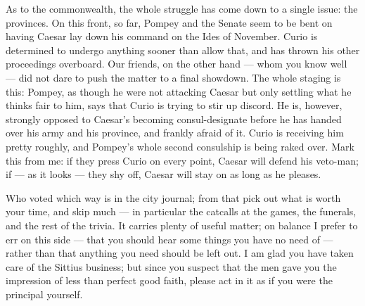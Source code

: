  As to the commonwealth, the whole struggle has come down to a single issue: the provinces. On this front, so far, Pompey and the Senate seem to be bent on having Caesar lay down his command on the Ides of November. Curio is determined to undergo anything sooner than allow that, and has thrown his other proceedings overboard. Our friends, on the other hand --- whom you know well --- did not dare to push the matter to a final showdown. The whole staging is this: Pompey, as though he were not attacking Caesar but only settling what he thinks fair to him, says that Curio is trying to stir up discord. He is, however, strongly opposed to Caesar's becoming consul-designate before he has handed over his army and his province, and frankly afraid of it. Curio is receiving him pretty roughly, and Pompey's whole second consulship is being raked over. Mark this from me: if they press Curio on every point, Caesar will defend his veto-man; if --- as it looks --- they shy off, Caesar will stay on as long as he pleases.

 Who voted which way is in the city journal; from that pick out what is worth your time, and skip much --- in particular the catcalls at the games, the funerals, and the rest of the trivia. It carries plenty of useful matter; on balance I prefer to err on this side --- that you should hear some things you have no need of --- rather than that anything you need should be left out. I am glad you have taken care of the Sittius business; but since you suspect that the men gave you the impression of less than perfect good faith, please act in it as if you were the principal yourself.
